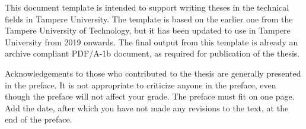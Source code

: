 This document template is intended to support writing theses in the technical fields in Tampere University. The template is based on the earlier one from the Tampere University of Technology, but it has been updated to use in Tampere University from 2019 onwards. The final output from this template is already an archive compliant PDF/A-1b document, as required for publication of the thesis.

Acknowledgements to those who contributed to the thesis are generally presented in the preface. It is not appropriate to criticize anyone in the preface, even though the preface will not affect your grade. The preface must fit on one page. Add the date, after which you have not made any revisions to the text, at the end of the preface.

